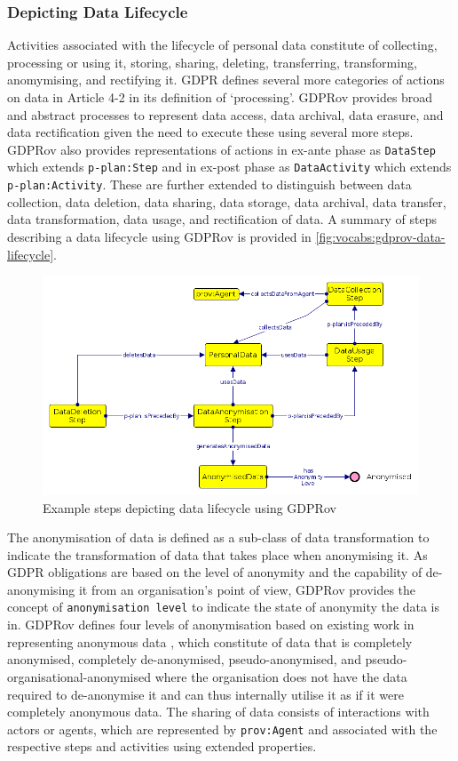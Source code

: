 \subsubsection{Depicting Data Lifecycle}
Activities associated with the lifecycle of personal data constitute of collecting, processing or using it, storing, sharing, deleting, transferring, transforming, anomymising, and rectifying it. GDPR defines several more categories of actions on data in Article 4-2 in its definition of `processing'.
GDPRov provides broad and abstract processes to represent data access, data archival, data erasure, and data rectification given the need to execute these using several more steps.
GDPRov also provides representations of actions in ex-ante phase as \texttt{DataStep} which extends \texttt{p-plan:Step} and in ex-post phase as \texttt{DataActivity} which extends \texttt{p-plan:Activity}.
These are further extended to distinguish between data collection, data deletion, data sharing, data storage, data archival, data transfer, data transformation, data usage, and rectification of data.
A summary of steps describing a data lifecycle using GDPRov is provided in \autoref{fig:vocabs:gdprov-data-lifecycle}.
\begin{figure}[htbp]
    \centering
    \includegraphics[width=\linewidth]{img/GDPRov_data_lifecycle.png}
    \caption{Example steps depicting data lifecycle using GDPRov}
    \label{fig:vocabs:gdprov-data-lifecycle}
\end{figure}

The anonymisation of data is defined as a sub-class of data transformation to indicate the transformation of data that takes place when anonymising it.
As GDPR obligations are based on the level of anonymity and the capability of de-anonymising it from an organisation's point of view, GDPRov provides the concept of \texttt{anonymisation level} to indicate the state of anonymity the data is in.
GDPRov defines four levels of anonymisation based on existing work in representing anonymous data \cite{hintze_meeting_2017}, which constitute of data that is completely anonymised, completely de-anonymised, pseudo-anonymised, and pseudo-organisational-anonymised where the organisation does not have the data required to de-anonymise it and can thus internally utilise it as if it were completely anonymous data.
The sharing of data consists of interactions with actors or agents, which are represented by \texttt{prov:Agent} and associated with the respective steps and activities using extended properties.

